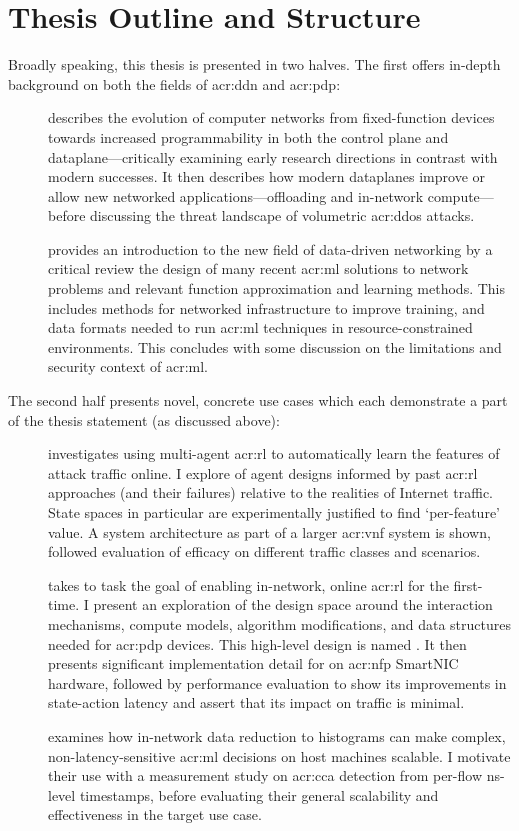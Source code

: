 \section{Thesis Outline and Structure}
Broadly speaking, this thesis is presented in two halves.
The first offers in-depth background on both the fields of \gls{acr:ddn} and \gls{acr:pdp}:
\begin{description}
	\item[] describes the evolution of computer networks from fixed-function devices towards increased programmability in both the control plane and dataplane---critically examining early research directions in contrast with modern successes. It then describes how modern dataplanes improve or allow new networked applications---offloading and in-network compute---before discussing the threat landscape of volumetric \gls{acr:ddos} attacks.
	\item[] provides an introduction to the new field of data-driven networking by a critical review the design of many recent \gls{acr:ml} solutions to network problems and relevant function approximation and learning methods. This includes methods for networked infrastructure to improve training, and data formats needed to run \gls{acr:ml} techniques in resource-constrained environments. This concludes with some discussion on the limitations and security context of \gls{acr:ml}.
\end{description}
The second half presents novel, concrete use cases which each demonstrate a part of the thesis statement (as discussed above):
\begin{description}
	\item[] investigates using multi-agent \gls{acr:rl} to automatically learn the features of attack traffic online. I explore of agent designs informed by past \gls{acr:rl} approaches (and their failures) relative to the realities of Internet traffic. State spaces in particular are experimentally justified to find `per-feature' value. A system architecture as part of a larger \gls{acr:vnf} system is shown, followed evaluation of efficacy on different traffic classes and scenarios.
	\item[] takes to task the goal of enabling in-network, online \gls{acr:rl} for the first-time. I present an exploration of the design space around the interaction mechanisms, compute models, algorithm modifications, and data structures needed for \gls{acr:pdp} devices. This high-level design is named \approachshort{}. It then presents significant implementation detail for \approachshort{} on \gls{acr:nfp} SmartNIC hardware, followed by performance evaluation to show its improvements in state-action latency and assert that its impact on traffic is minimal.
	\item[] examines how in-network data reduction to histograms can make complex, non-latency-sensitive \gls{acr:ml} decisions on host machines scalable. I motivate their use with a measurement study on \gls{acr:cca} detection from per-flow \unit{\nano\second}-level timestamps, before evaluating their general scalability and effectiveness in the target use case.
\end{description}
